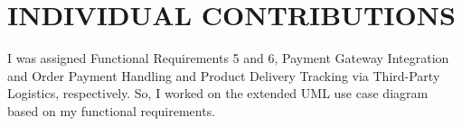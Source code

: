 \chapter{INDIVIDUAL CONTRIBUTIONS} \label{ch:data}
I was assigned Functional Requirements 5 and 6, Payment Gateway Integration and Order Payment Handling and Product Delivery Tracking via Third-Party Logistics, respectively. So, I worked on the extended UML use case diagram based on my functional requirements.